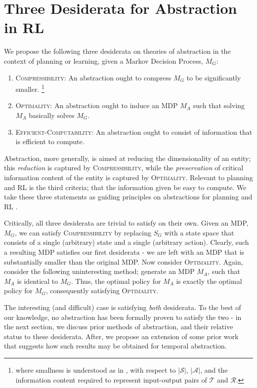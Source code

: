 \section{Three Desiderata for Abstraction in RL}

We propose the following three desiderata on theories of abstraction in the context of planning or learning, given a Markov Decision Process, $M_G$:
\begin{enumerate}
\item \textsc{Compressibility}: An abstraction ought to compress $M_G$ to be significantly smaller. \footnote{where smallness is understood as in \cite{littman1995complexity}, with respect to $|\mathcal{S}|$, $|\mathcal{A}|$, and the information content required to represent input-output pairs of $\mathcal{T}$ and $\mathcal{R}$.}
\item \textsc{Optimality}: An abstraction ought to induce an MDP $M_A$ such that solving $M_A$ basically solves $M_G$.
\item \textsc{Efficient-Computability}: An abstraction ought to consist of information that is efficient to compute.
\end{enumerate}

Abstraction, more generally, is aimed at reducing the dimensionality of an entity; this {\it reduction} is captured by \textsc{Compressibility}, while the {\it preservation} of critical information content of the entity is captured by \textsc{Optimality}. Relevant to planning and RL is the third criteria; that the information given be easy to compute. We take these three statements as guiding principles on abstractions for planning and \ac{RL} .

Critically, all three desiderata are trivial to satisfy on their own. Given an \ac{MDP}, $M_G$, we can satisfy \textsc{Compressibility} by replacing $S_G$ with a state space that consists of a single (arbitrary) state and a single (arbitrary action). Clearly, such a resulting \ac{MDP} satisfies our first desiderata - we are left with an MDP that is substantially smaller than the original MDP. Now consider \textsc{Optimality}. Again, consider the following uninteresting method; generate an MDP $M_A$, such that $M_A$ is identical to $M_G$. Thus, the optimal policy for $M_A$ is exactly the optimal policy for $M_G$, consequently satisfying \textsc{Optimality}.

The interesting (and difficult) case is satisfying {\it both} desiderata. To the best of our knowledge, no abstraction has been formally proven to satisfy the two - in the next section, we discuss prior methods of abstraction, and their relative status to these desiderata. After, we propose an extension of some prior work that suggests how such results may be obtained for temporal abstraction.